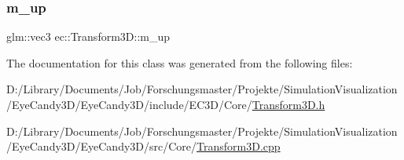 \mbox{\label{classec_1_1_transform3_d_addd1132fb57befe841dfd9af94aa4329}} 
\subsubsection{\texorpdfstring{m\+\_\+up}{m\_up}}
{\footnotesize\ttfamily glm\+::vec3 ec\+::\+Transform3\+D\+::m\+\_\+up\hspace{0.3cm}{\ttfamily [protected]}}



The documentation for this class was generated from the following files\+:\begin{DoxyCompactItemize}
\item 
D\+:/\+Library/\+Documents/\+Job/\+Forschungsmaster/\+Projekte/\+Simulation\+Visualization/\+Eye\+Candy3\+D/\+Eye\+Candy3\+D/include/\+E\+C3\+D/\+Core/\mbox{\hyperlink{_transform3_d_8h}{Transform3\+D.\+h}}\item 
D\+:/\+Library/\+Documents/\+Job/\+Forschungsmaster/\+Projekte/\+Simulation\+Visualization/\+Eye\+Candy3\+D/\+Eye\+Candy3\+D/src/\+Core/\mbox{\hyperlink{_transform3_d_8cpp}{Transform3\+D.\+cpp}}\end{DoxyCompactItemize}
